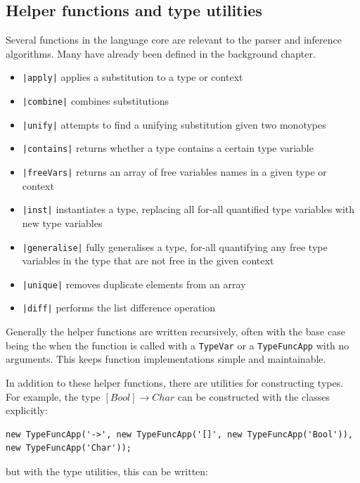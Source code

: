 \documentclass[a4paper,fleqn,oneside,12pt]{report}
\begin{document}
\subsection{Helper functions and type utilities}\label{id:h.sw77qek8b49p}

Several functions in the language core are relevant to the parser and inference algorithms. Many have already been defined in the background chapter.

\begin{itemize}
  \item \texttt{|apply|} applies a substitution to a type or context
  \item \texttt{|combine|} combines substitutions
  \item \texttt{|unify|} attempts to find a unifying substitution given two monotypes
  \item \texttt{|contains|} returns whether a type contains a certain type variable
  \item \texttt{|freeVars|} returns an array of free variables names in a given type or context
  \item \texttt{|inst|} instantiates a type, replacing all for-all quantified type variables with new type variables
  \item \texttt{|generalise|} fully generalises a type, for-all quantifying any free type variables in the type that are not free in the given context
  \item \texttt{|unique|} removes duplicate elements from an array
  \item \texttt{|diff|} performs the list difference operation
\end{itemize}

Generally the helper functions are written recursively, often with the base case being the when the function is called with a \texttt{TypeVar} or a \texttt{TypeFuncApp} with no arguments. This keeps function implementations simple and maintainable.

In addition to these helper functions, there are utilities for constructing types. For example, the type $[Bool] \rightarrow Char$ can be constructed with the classes explicitly:

\begin{verbatim}
new TypeFuncApp('->', new TypeFuncApp('[]', new TypeFuncApp('Bool')), new TypeFuncApp('Char'));
\end{verbatim}
but with the type utilities, this can be written:
\end{document}

